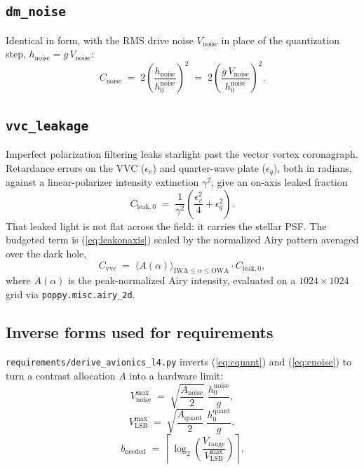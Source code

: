 \subsection{\texttt{dm\_noise}}

Identical in form, with the RMS drive noise $V_{\mathrm{noise}}$ in place of the
quantization step, $h_{\mathrm{noise}} = g\,V_{\mathrm{noise}}$:
%
\begin{equation}
  C_{\mathrm{noise}}
  \;=\;
  2\left(\frac{h_{\mathrm{noise}}}{h_0^{\mathrm{noise}}}\right)^{\!2}
  \;=\;
  2\left(\frac{g\,V_{\mathrm{noise}}}{h_0^{\mathrm{noise}}}\right)^{\!2} .
  \label{eq:cnoise}
\end{equation}

\subsection{\texttt{vvc\_leakage}}

Imperfect polarization filtering leaks starlight past the vector vortex
coronagraph. Retardance errors on the VVC ($\epsilon_v$) and quarter-wave plate
($\epsilon_q$), both in radians, against a linear-polarizer intensity extinction
$\gamma^2$, give an on-axis leaked fraction
%
\begin{equation}
  C_{\mathrm{leak},0}
  \;=\;
  \frac{1}{\gamma^{2}}
  \left(\frac{\epsilon_v^{2}}{4} + \epsilon_q^{2}\right).
  \label{eq:leakonaxis}
\end{equation}
%
That leaked light is not flat across the field: it carries the stellar PSF. The
budgeted term is (\ref{eq:leakonaxis}) scaled by the normalized Airy pattern
averaged over the dark hole,
%
\begin{equation}
  C_{\mathrm{vvc}}
  \;=\;
  \big\langle A(\alpha) \big\rangle_{\mathrm{IWA} \le \alpha \le \mathrm{OWA}}
  \cdot
  C_{\mathrm{leak},0} ,
  \label{eq:cvvc}
\end{equation}
%
where $A(\alpha)$ is the peak-normalized Airy intensity, evaluated on a
$1024 \times 1024$ grid via \texttt{poppy.misc.airy\_2d}.

\subsection{Inverse forms used for requirements}

\texttt{requirements/derive\_avionics\_l4.py} inverts (\ref{eq:cquant}) and
(\ref{eq:cnoise}) to turn a contrast allocation $A$ into a hardware limit:
%
\begin{equation}
  V_{\mathrm{noise}}^{\max} \;=\; \sqrt{\frac{A_{\mathrm{noise}}}{2}}\;
    \frac{h_0^{\mathrm{noise}}}{g} ,
  \label{eq:vnoisemax}
\end{equation}
\begin{equation}
  V_{\mathrm{LSB}}^{\max} \;=\; \sqrt{\frac{A_{\mathrm{quant}}}{2}}\;
    \frac{h_0^{\mathrm{quant}}}{g} ,
  \label{eq:vlsbmax}
\end{equation}
\begin{equation}
  b_{\mathrm{needed}} \;=\; \left\lceil
    \log_2\!\left(\frac{V_{\mathrm{range}}}{V_{\mathrm{LSB}}^{\max}}\right)
    \right\rceil .
  \label{eq:bits}
\end{equation}

